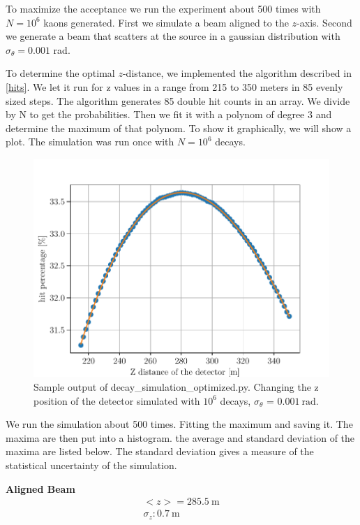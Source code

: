 \documentclass[12pt,a4paper,oneside,english]{article}
\begin{document}
	To maximize the acceptance we run the experiment about 500 times with $N = 10^6 $ kaons generated. First we simulate a beam aligned to the $z$-axis. Second we generate a beam that scatters at the source in a gaussian distribution with $\sigma _{\theta} = 0.001$ rad. 
	
	To determine the optimal $z$-distance, we implemented the algorithm described in \ref{hits}. We let it run for z values in a range from 215 to 350 meters in 85 evenly sized steps. The algorithm generates 85 double hit counts in an array. We divide by N to get the probabilities. Then we fit it with a polynom of degree 3 and determine the maximum of that polynom. To show it graphically, we will show a plot. The simulation was run once with $N = 10^6 $ decays.
	
\begin{figure}
	\centering
	\includegraphics[width=0.8\linewidth]{images/sample_figure_1000000.pdf}
	\caption{Sample output of decay\_simulation\_optimized.py. Changing the z position of the detector simulated with $10^6$ decays, $\sigma_{\theta}$ = $\SI{0.001}{\radian}$.}
	\label{fig:decay_simulation}
\end{figure}
	
	We run the simulation about 500 times. Fitting the maximum and saving it. The maxima are then put into a histogram.  the average and standard deviation of the maxima are listed below. The standard deviation gives a measure of the statistical uncertainty of the simulation.
	
	\textbf{Aligned Beam}
		\begin{align*}
		 <z> = \SI{285.5}{\meter}\\
		\sigma _z  : \SI{0.7}{\meter}\\
		\end{align*}
	
\end{document}
